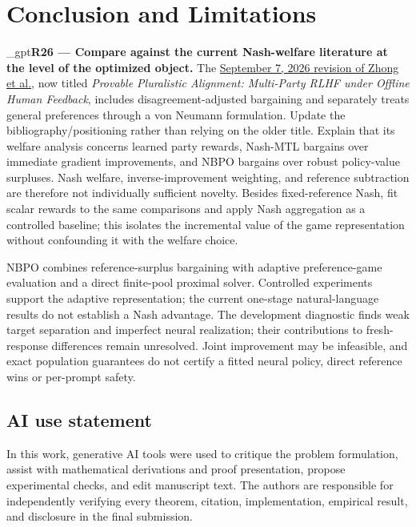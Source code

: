 \documentclass{article}
\newif\ifshowreviews
\newcommand{\reviewresponse}[1]{%
  \ifshowreviews
  \par\begingroup\color{blue!65!black}\hypersetup{allcolors=blue!65!black}\emergencystretch=2em%
  \noindent\textbf{Response:} #1\par\endgroup
  \fi}
\theoremstyle{remark}
\theoremstyle{plain}
\newcommand{\NBPO}{\textsc{NBPO}}
\begin{document}
\section{Conclusion and Limitations}
\label{sec:conclusion}

\kekim_gpt{\textbf{R26 --- Compare against the current Nash-welfare literature at the level of the optimized object.} The \href{https://arxiv.org/abs/2403.05006v2}{September 7, 2026 revision of Zhong et al.}, now titled \emph{Provable Pluralistic Alignment: Multi-Party RLHF under Offline Human Feedback}, includes disagreement-adjusted bargaining and separately treats general preferences through a von Neumann formulation. Update the bibliography/positioning rather than relying on the older title. Explain that its welfare analysis concerns learned party rewards, Nash-MTL bargains over immediate gradient improvements, and NBPO bargains over robust policy-value surpluses. Nash welfare, inverse-improvement weighting, and reference subtraction are therefore not individually sufficient novelty. Besides fixed-reference Nash, fit scalar rewards to the same comparisons and apply Nash aggregation as a controlled baseline; this isolates the incremental value of the game representation without confounding it with the welfare choice.}
\reviewresponse{\textbf{R26 --- Partially addressed.} Related Work distinguishes welfare over learned party rewards, von Neumann solutions, gradient bargaining and robust policy-value surpluses. BT-RM--Nash is included in controlled and UF comparisons. The natural results and direct-feedback audit do not establish a representation advantage; Nash welfare, reference subtraction and inverse-surplus weighting are not presented as individually novel.}

\NBPO{} combines reference-surplus bargaining with adaptive preference-game evaluation and a direct finite-pool proximal solver. Controlled experiments support the adaptive representation; the current one-stage natural-language results do not establish a Nash advantage. The development diagnostic finds weak target separation and imperfect neural realization; their contributions to fresh-response differences remain unresolved. Joint improvement may be infeasible, and exact population guarantees do not certify a fitted neural policy, direct reference wins or per-prompt safety.

\subsection*{AI use statement}
In this work, generative AI tools were used to critique the problem formulation, assist with mathematical derivations and proof presentation, propose experimental checks, and edit manuscript text. The authors are responsible for independently verifying every theorem, citation, implementation, empirical result, and disclosure in the final submission.
\end{document}
